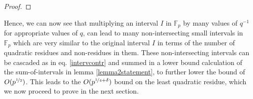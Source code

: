 \documentclass{report}
\begin{document}
\begin{proof}
\begin{comment}
For a fixed $q$, $I(q,t)$ are disjoint as $H<p$. Now, for a pair of different values of $q$, say $q_1$ and $q_2$, let $I(q_1,t_1)$ and $I(q_2,t_2)$ intersect. Then we can say:
$$\frac{N+t_1p}{q_1} \leq \frac{N+H+t_2p}{q_2}$$
$$\text{and}\text{ }\frac{N+t_2p}{q_2} \leq \frac{N+H+t_1p}{q_1}$$
$$\Rightarrow N(q_2-q_1)+(t_1q_2-t_2q_1)p\leq Hq_2<\frac{1}{2}p$$
$$\Rightarrow N(q_1-q_2)+(t_2q_1-t_1q_2)p\leq Hq_1<\frac{1}{2}p$$
$$\Rightarrow N(q_2-q_1)-\frac{1}{2}p < (t_2q_1-t_1q_2)p <N(q_2-q_1)+\frac{1}{2}p$$
Since not more than a single multiple of $p$ can occur in a range of size less than $p$, $t_2q_1-t_1q_2$ can take only one value. Because $q_1$ and $q_2$ are co-prime and $0\leq t_1 \leq q_1$ and $0\leq t_2 \leq q_2$, there is only one pair of $t_1$ and $t_2$ values for a unique $t_2q_1-t_1q_2$. This is because for a unique valuation of $t_2q_1-t_1q_2$, the difference in the valuation of the first term must be same as that of the second term for different values of $t_2$. The values of $t_2q_1$ will be multiples of $q_1$, and for the difference in two such values to be the same as two values of $t_1q_2$, a multiple of $q_2$, the least possible difference can be the l.c.m $q_1q_2$, which cannot occur from given range of $t_1$ and $t_2$.

Hence, for each $q$, there are at least $q-Q$ values of $t\in \{0,1,\ldots q-1\}$ such that $I(q,t)$ are disjoint from all other intervals associated with all $q$.
\end{comment}
\end{proof}

Hence, we can now see that multiplying an interval $I$ in $\mathbb{F}_p$ by many values of $q^{-1}$ for appropriate values of $q$, can lead to many non-intersecting small intervals in $\mathbb{F}_p$ which are very similar to the original interval $I$ in terms of the number of quadratic residues and non-residues in them. These non-intersecting intervals can be cascaded as in eq. \ref{intervcontr} and summed in a lower bound calculation of the sum-of-intervals in lemma \ref{lemma2statement}, to further lower the bound of $O(p^{\nicefrac{1}{2}})$. This leads to the $O(p^{\nicefrac{1}{4}+\delta})$ bound on the least quadratic residue, which we now proceed to prove in the next section.
%
%
\end{document}

